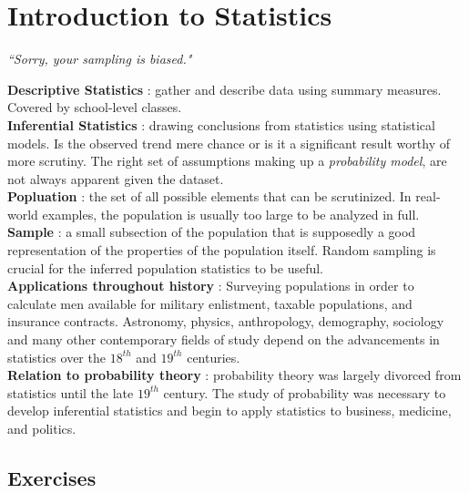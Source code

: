 \chapter{Introduction to Statistics}

\begin{flushright}
	\textit{``Sorry, your sampling is biased."} \\
\end{flushright}

\textbf{Descriptive Statistics} : gather and describe data using summary measures. Covered by school-level classes. \\

\textbf{Inferential Statistics} : drawing conclusions from statistics using statistical models. Is the observed trend mere chance or is it a significant result worthy of more scrutiny. The right set of assumptions making up a \textit{probability model}, are not always apparent given the dataset. \\

\textbf{Popluation} : the set of all possible elements that can be scrutinized. In real-world examples, the population is usually too large to be analyzed in full. \\

\textbf{Sample} : a small subsection of the population that is supposedly a good representation of the properties of the population itself. Random sampling is crucial for the inferred population statistics to be useful. \\

\textbf{Applications throughout history} : Surveying populations in order to calculate men available for military enlistment, taxable populations, and insurance contracts. Astronomy, physics, anthropology, demography, sociology and many other contemporary fields of study depend on the advancements in statistics over the $ 18^{th} $ and $19^{th}$ centuries. \\

\textbf{Relation to probability theory} : probability theory was largely divorced from statistics until the late $ 19^{th} $ century. The study of probability was necessary to develop inferential statistics and begin to apply statistics to business, medicine, and politics. \\

\newpage

\section*{Exercises}

